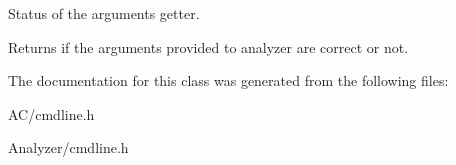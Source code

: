 Status of the arguments getter. 

\begin{DoxyReturn}{Returns}
if the arguments provided to analyzer are correct or not. 
\end{DoxyReturn}


The documentation for this class was generated from the following files\-:\begin{DoxyCompactItemize}
\item 
A\-C/cmdline.\-h\item 
Analyzer/cmdline.\-h\end{DoxyCompactItemize}
